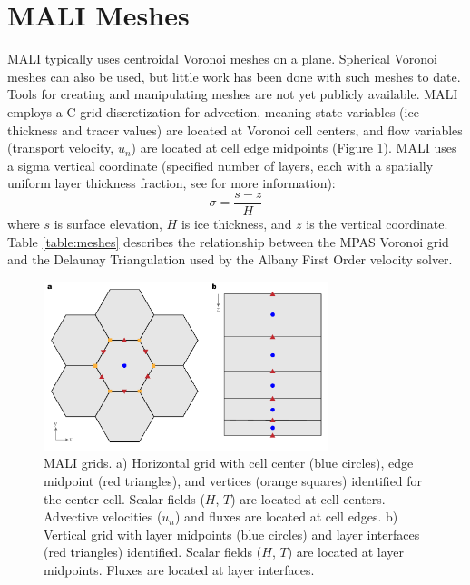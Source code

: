 \section{MALI Meshes}

MALI typically uses centroidal Voronoi meshes on a plane.  
Spherical Voronoi meshes can also be used, but little work has been done with such meshes to date. 
Tools for creating and manipulating meshes are not yet publicly available.
MALI employs a C-grid discretization \citep{Arakawa1977} for advection, meaning state variables (ice thickness and tracer values) are located at Voronoi cell centers,
and flow variables (transport velocity, $u_n$) are located at cell edge midpoints (Figure \ref{fig:cellDiagram}).
MALI uses a sigma vertical coordinate (specified number of layers, each with a spatially uniform layer thickness fraction, see \citep{Petersen2015} for more information):
\begin{equation}
\sigma = \frac{s-z}{H}
\label{eq:sigma}
\end{equation}
where $s$ is surface elevation, $H$ is ice thickness, and $z$ is the vertical coordinate. 
Table \ref{table:meshes} describes the relationship between the MPAS Voronoi grid and the Delaunay Triangulation used by the Albany First Order velocity solver.

\begin{figure}[h]
\includegraphics[width=8.3cm]{landice/figures/mpas_grids.pdf}
\caption{MALI grids.  
a) Horizontal grid with cell center (blue circles), edge midpoint (red triangles), and vertices (orange squares) identified for the center cell. Scalar fields ($H$, $T$) are located at cell centers.  Advective velocities ($u_n$) and fluxes are located at cell edges.
b) Vertical grid with layer midpoints (blue circles) and layer interfaces (red triangles) identified.  
Scalar fields ($H$, $T$) are located at layer midpoints.  Fluxes are located at layer interfaces.
}
\label{fig:cellDiagram}
\end{figure}


